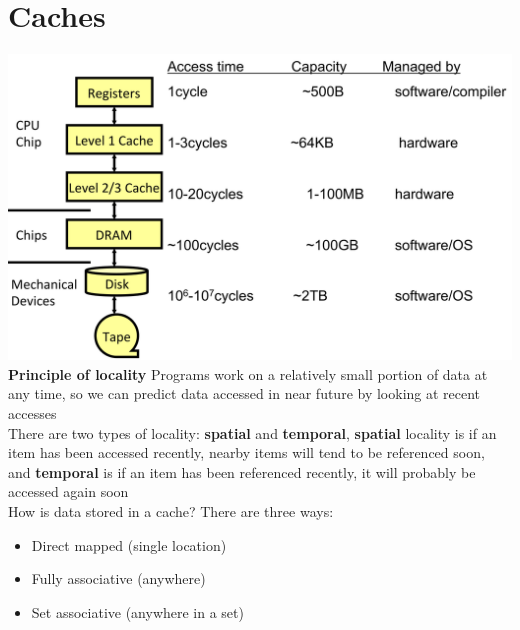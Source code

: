 \section{Caches}
\includegraphics[width=\linewidth]{png/mem.png}
\textbf{Principle of locality} Programs work on a relatively small portion of data
at any time, so we can predict data accessed in near future by looking at recent accesses\\

There are two types of locality: \textbf{spatial} and \textbf{temporal},
\textbf{spatial} locality is if an item has been accessed recently, nearby items will tend to be
referenced soon, and \textbf{temporal} is if an item has been referenced recently,
it will probably be accessed again soon \\
How is data stored in a cache? There are three ways:\\
\begin{itemize}
\item Direct mapped (single location)
\item Fully associative (anywhere)
\item Set associative (anywhere in a set)
\end{itemize}

